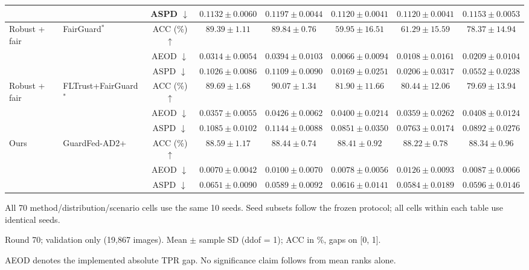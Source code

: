 \begin{table}[t]
{\begin{tabular}{l|l|c|ccccc}
 &  & ASPD $\downarrow$ & $0.1132 \pm 0.0060$ & $0.1197 \pm 0.0044$ & $0.1120 \pm 0.0041$ & $0.1120 \pm 0.0041$ & $0.1153 \pm 0.0053$ \\
\hline
\multirow{3}{*}{Robust + fair} & \multirow{3}{*}{FairGuard$^{*}$} & ACC (\%) $\uparrow$ & $89.39 \pm 1.11$ & $89.84 \pm 0.76$ & $59.95 \pm 16.51$ & $61.29 \pm 15.59$ & $78.37 \pm 14.94$ \\
 &  & AEOD $\downarrow$ & $0.0314 \pm 0.0054$ & $0.0394 \pm 0.0103$ & $0.0066 \pm 0.0094$ & $0.0108 \pm 0.0161$ & $0.0209 \pm 0.0104$ \\
 &  & ASPD $\downarrow$ & $0.1026 \pm 0.0086$ & $0.1109 \pm 0.0090$ & $0.0169 \pm 0.0251$ & $0.0206 \pm 0.0317$ & $0.0552 \pm 0.0238$ \\
\hline
\multirow{3}{*}{Robust + fair} & \multirow{3}{*}{FLTrust+FairGuard$^{*}$} & ACC (\%) $\uparrow$ & $89.69 \pm 1.68$ & $90.07 \pm 1.34$ & $81.90 \pm 11.66$ & $80.44 \pm 12.06$ & $79.69 \pm 13.94$ \\
 &  & AEOD $\downarrow$ & $0.0357 \pm 0.0055$ & $0.0426 \pm 0.0062$ & $0.0400 \pm 0.0214$ & $0.0359 \pm 0.0262$ & $0.0408 \pm 0.0124$ \\
 &  & ASPD $\downarrow$ & $0.1085 \pm 0.0102$ & $0.1144 \pm 0.0088$ & $0.0851 \pm 0.0350$ & $0.0763 \pm 0.0174$ & $0.0892 \pm 0.0276$ \\
\hline
\multirow{3}{*}{Ours} & \multirow{3}{*}{GuardFed-AD2+} & ACC (\%) $\uparrow$ & $88.59 \pm 1.17$ & $88.44 \pm 0.74$ & $88.41 \pm 0.92$ & $88.22 \pm 0.78$ & $88.34 \pm 0.96$ \\
 &  & AEOD $\downarrow$ & $0.0070 \pm 0.0042$ & $0.0100 \pm 0.0070$ & $0.0078 \pm 0.0056$ & $0.0126 \pm 0.0093$ & $0.0087 \pm 0.0066$ \\
 &  & ASPD $\downarrow$ & $0.0651 \pm 0.0090$ & $0.0589 \pm 0.0092$ & $0.0616 \pm 0.0141$ & $0.0584 \pm 0.0189$ & $0.0596 \pm 0.0146$ \\
\hline\hline
\end{tabular}}
\par\smallskip
\begin{minipage}{\textwidth}\scriptsize
All 70 method/distribution/scenario cells use the same 10 seeds. Seed subsets follow the frozen protocol; all cells within each table use identical seeds.\par
Round 70; validation only (19,867 images). Mean $\pm$ sample SD (ddof = 1); ACC in \%, gaps on [0, 1].\par
AEOD denotes the implemented absolute TPR gap. No significance claim follows from mean ranks alone.\par

\end{minipage}
\end{table}
